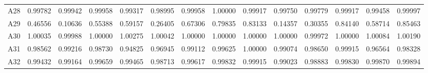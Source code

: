 \begin{tabular}{cccccccccccccc}
     A28   &  0.99782 &  0.99942 &  0.99958 &  0.99317 &  0.98995 &  0.99958 &  1.00000 &  0.99917 &  0.99750 &  0.99779 &  0.99917 &  0.99458 &  0.99997\\ 
     A29   &  0.46556 &  0.10636 &  0.55388 &  0.59157 &  0.26405 &  0.67306 &  0.79835 &  0.83133 &  0.14357 &  0.30355 &  0.84140 &  0.58714 &  0.85463\\ 
     A30   &  1.00035 &  0.99988 &  1.00000 &  1.00275 &  1.00042 &  1.00000 &  1.00000 &  1.00000 &  1.00000 &  0.99972 &  1.00000 &  1.00084 &  1.00190\\ 
     A31   &  0.98562 &  0.99216 &  0.98730 &  0.94825 &  0.96945 &  0.99112 &  0.99625 &  1.00000 &  0.99074 &  0.98650 &  0.99915 &  0.96564 &  0.98328\\ 
     A32   &  0.99432 &  0.99164 &  0.99659 &  0.99465 &  0.98713 &  0.99617 &  0.99832 &  0.99915 &  0.99023 &  0.98883 &  0.99830 &  0.99870 &  0.99894\\ 
    \bottomrule
    \end{tabular}
